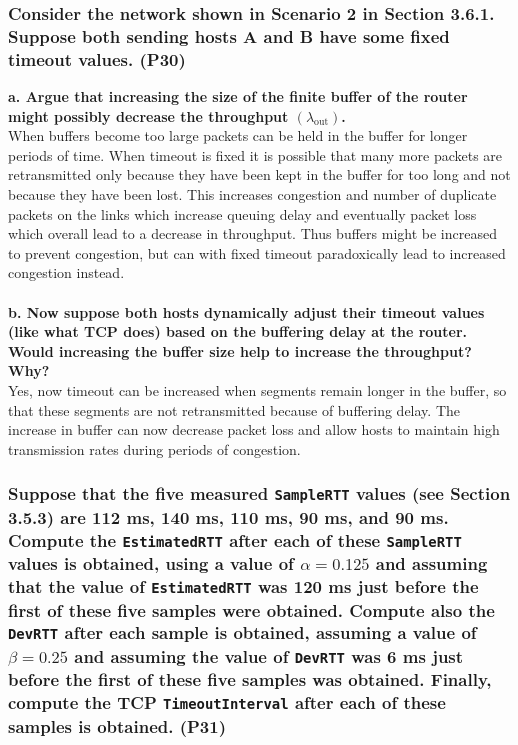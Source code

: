 \subsubsection{Consider the network shown in Scenario 2 in Section 3.6.1. Suppose both sending hosts A and B have some fixed timeout values. (P30)}

\textbf{a. Argue that increasing the size of the finite buffer of the router might possibly decrease the throughput $(\lambda_{\text{out}})$.} \\
When buffers become too large packets can be held in the buffer for longer periods of time. When timeout is fixed it is possible that many more packets are retransmitted only because they have been kept in the buffer for too long and not because they have been lost. This increases congestion and number of duplicate packets on the links which increase queuing delay and eventually packet loss which overall lead to a decrease in throughput. Thus buffers might be increased to prevent congestion, but can with fixed timeout paradoxically lead to increased congestion instead. \\ 
\\
\textbf{b. Now suppose both hosts dynamically adjust their timeout values (like what TCP does) based on the buffering delay at the router. Would increasing the buffer size help to increase the throughput? Why?} \\
Yes, now timeout can be increased when segments remain longer in the buffer, so that these segments are not retransmitted because of buffering delay. The increase in buffer can now decrease packet loss and allow hosts to maintain high transmission rates during periods of congestion.

\subsubsection{Suppose that the five measured \texttt{SampleRTT} values (see Section 3.5.3) are 112 ms, 140 ms, 110 ms, 90 ms, and 90 ms. Compute the \texttt{EstimatedRTT} after each of these \texttt{SampleRTT} values is obtained, using a value of  $\alpha = 0.125$ and assuming that the value of \texttt{EstimatedRTT} was 120 ms just before the first of these five samples were obtained. Compute also the \texttt{DevRTT} after each sample is obtained, assuming a value of $\beta = 0.25$ and assuming the value of \texttt{DevRTT} was 6 ms just before the first of these five samples was obtained. Finally, compute the TCP \texttt{TimeoutInterval} after each of these samples is obtained. (P31)}

